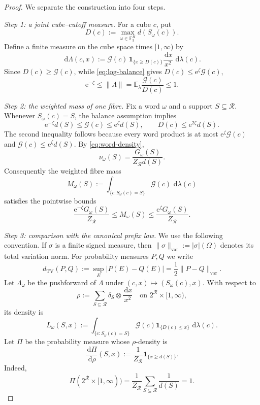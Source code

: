 \documentclass[11pt]{article}
\numberwithin{equation}{section}
\theoremstyle{plain}
\newcommand{\F}{\mathbb F}
\newcommand{\E}{\mathbb E}
\newcommand{\1}{\mathbf 1}
\newcommand{\dd}{\,\mathrm d}
\newcommand{\e}{\mathrm e}
\newcommand{\cR}{\mathcal R}
\newcommand{\TV}{\operatorname{TV}}
\begin{document}
\begin{proof}
We separate the construction into four steps.

\smallskip
\noindent\emph{Step 1: a joint cube--cutoff measure.}
For a cube $c$, put
\[
 D(c):=\max_{\omega\in\F_3^H}d(S_\omega(c)).
\]
Define a finite measure on the cube space times $[1,\infty)$ by
\begin{equation}\label{eq:joint-measure}
 \dd\Lambda(c,x):=
 \mathcal G(c)\,\1_{\{x\ge D(c)\}}
 \frac{\dd x}{x^2}\,\dd\lambda(c).
\end{equation}
Since $D(c)\ge\mathcal G(c)$, while \eqref{eq:log-balance} gives
$D(c)\le\e^\zeta\mathcal G(c)$,
\begin{equation}\label{eq:joint-mass}
 \e^{-\zeta}\le
 \|\Lambda\|
 =\E_\lambda\frac{\mathcal G(c)}{D(c)}
 \le1.
\end{equation}

\smallskip
\noindent\emph{Step 2: the weighted mass of one fibre.}
Fix a word $\omega$ and a support $S\subseteq\cR$.  Whenever
$S_\omega(c)=S$, the balance assumption implies
\begin{equation}\label{eq:fibre-balance}
 \e^{-\zeta}d(S)\le\mathcal G(c)\le\e^\zeta d(S),
 \qquad
 D(c)\le\e^{2\zeta}d(S).
\end{equation}
The second inequality follows because every word product is at most
$\e^\zeta\mathcal G(c)$ and
$\mathcal G(c)\le\e^\zeta d(S)$.  By \eqref{eq:word-density},
\[
 \nu_\omega(S)=\frac{G_\omega(S)}{Z_{\cR}d(S)}.
\]
Consequently the weighted fibre mass
\[
 M_\omega(S):=
 \int_{\{c:S_\omega(c)=S\}}\mathcal G(c)\,\dd\lambda(c)
\]
satisfies the pointwise bounds
\begin{equation}\label{eq:weighted-fibre}
 \frac{\e^{-\zeta}G_\omega(S)}{Z_{\cR}}
 \le M_\omega(S)\le
 \frac{\e^\zeta G_\omega(S)}{Z_{\cR}}.
\end{equation}

\smallskip
\noindent\emph{Step 3: comparison with the canonical prefix law.}
We use the following convention.  If $\sigma$ is a finite signed measure,
then $\|\sigma\|_{\mathrm{var}}:=|\sigma|(\Omega)$ denotes its total
variation norm.  For probability measures $P,Q$ we write
\[
 d_{\TV}(P,Q):=\sup_E|P(E)-Q(E)|
 =\frac12\|P-Q\|_{\mathrm{var}}.
\]
Let $\Lambda_\omega$ be the pushforward of $\Lambda$ under
$(c,x)\mapsto(S_\omega(c),x)$.  With respect to
\[
 \rho:=\sum_{S\subseteq\cR}\delta_S\otimes\frac{\dd x}{x^2}
 \quad\text{on }2^{\cR}\times[1,\infty),
\]
its density is
\[
 L_\omega(S,x):=
 \int_{\{c:S_\omega(c)=S\}}
 \mathcal G(c)\1_{\{D(c)\le x\}}\,\dd\lambda(c).
\]
Let $\Pi$ be the probability measure whose $\rho$-density is
\begin{equation}\label{eq:canonical-prefix-law}
 \frac{\dd\Pi}{\dd\rho}(S,x)
 :=\frac1{Z_{\cR}}\1_{\{x\ge d(S)\}}.
\end{equation}
Indeed,
\[
 \Pi(2^{\cR}\times[1,\infty))
 =\frac1{Z_{\cR}}\sum_{S\subseteq\cR}\frac1{d(S)}=1.
\]


\end{proof}
\end{document}
